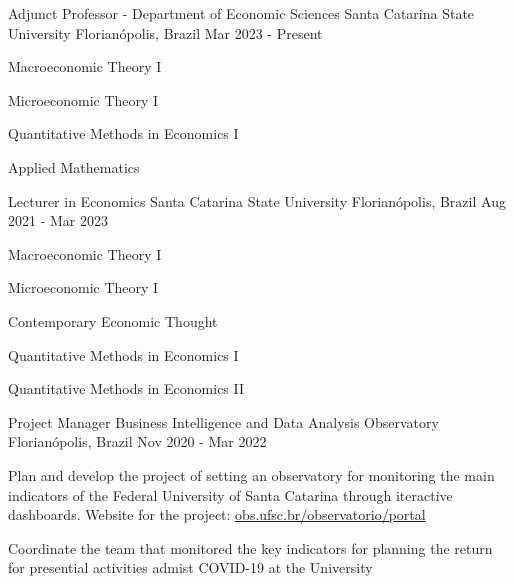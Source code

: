 

\begin{cventries}

  \cventry
    {Adjunct Professor - Department of Economic Sciences} %
    {Santa Catarina State University} %
    {Florianópolis, Brazil} %
    {Mar 2023 - Present} %
    {
     \begin{cvitems} %
        \item {Macroeconomic Theory I}
        \item {Microeconomic Theory I}        
        \item {Quantitative Methods in Economics I}
        \item {Applied Mathematics}
      \end{cvitems}
    }

  \cventry
    {Lecturer in Economics} %
    {Santa Catarina State University} %
    {Florianópolis, Brazil} %
    {Aug 2021 - Mar 2023} %
    {
     \begin{cvitems} %
        \item {Macroeconomic Theory I}
        \item {Microeconomic Theory I}
        \item {Contemporary Economic Thought}
        \item {Quantitative Methods in Economics I}
        \item {Quantitative Methods in Economics II}
      \end{cvitems}
    }

  \cventry
    {Project Manager} %
    {Business Intelligence and Data Analysis Observatory} %
    {Florianópolis, Brazil} %
    {Nov 2020 - Mar 2022} %
    {
      \begin{cvitems} %
        \item {Plan and develop the project of setting an observatory for monitoring the main indicators of the Federal University of Santa Catarina through iteractive dashboards. Website for the project: \href{https://obs.ufsc.br/observatorio/portal/}{obs.ufsc.br/observatorio/portal}}
        \item {Coordinate the team that monitored the key indicators for planning the return for presential activities admist COVID-19 at the University}
      \end{cvitems}
    }


\end{cventries}
